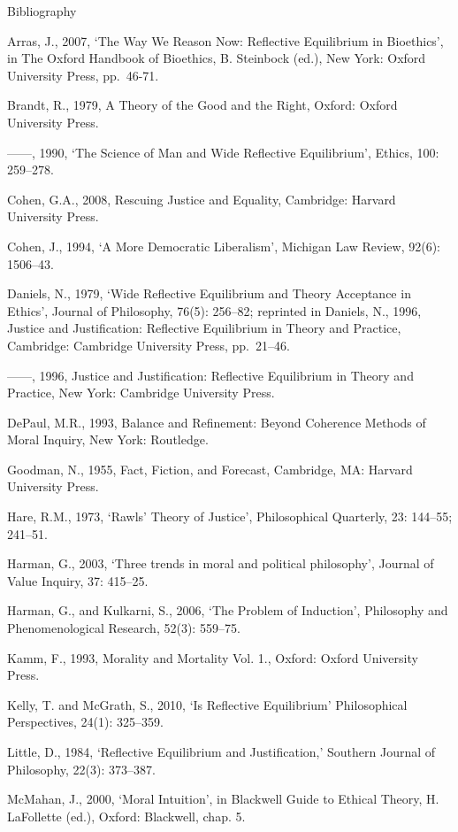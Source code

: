 \documentclass[]{article}
\begin{document}
\hypertarget{bibliography}{}
\protect\hypertarget{Bib}{}{Bibliography}

Arras, J., 2007, `The Way We Reason Now: Reflective Equilibrium in
Bioethics', in The Oxford Handbook of Bioethics, B. Steinbock (ed.), New
York: Oxford University Press, pp.~46-71.

Brandt, R., 1979, A Theory of the Good and the Right, Oxford: Oxford
University Press.

------, 1990, `The Science of Man and Wide Reflective Equilibrium',
Ethics, 100: 259--278.

Cohen, G.A., 2008, Rescuing Justice and Equality, Cambridge: Harvard
University Press.

Cohen, J., 1994, `A More Democratic Liberalism', Michigan Law Review,
92(6): 1506--43.

Daniels, N., 1979, `Wide Reflective Equilibrium and Theory Acceptance in
Ethics', Journal of Philosophy, 76(5): 256--82; reprinted in Daniels,
N., 1996, Justice and Justification: Reflective Equilibrium in Theory
and Practice, Cambridge: Cambridge University Press, pp.~21--46.

------, 1996, Justice and Justification: Reflective Equilibrium in
Theory and Practice, New York: Cambridge University Press.

DePaul, M.R., 1993, Balance and Refinement: Beyond Coherence Methods of
Moral Inquiry, New York: Routledge.

Goodman, N., 1955, Fact, Fiction, and Forecast, Cambridge, MA: Harvard
University Press.

Hare, R.M., 1973, `Rawls' Theory of Justice', Philosophical Quarterly,
23: 144--55; 241--51.

Harman, G., 2003, `Three trends in moral and political philosophy',
Journal of Value Inquiry, 37: 415--25.

Harman, G., and Kulkarni, S., 2006, `The Problem of Induction',
Philosophy and Phenomenological Research, 52(3): 559--75.

Kamm, F., 1993, Morality and Mortality Vol. 1., Oxford: Oxford
University Press.

Kelly, T. and McGrath, S., 2010, `Is Reflective Equilibrium'
Philosophical Perspectives, 24(1): 325--359.

Little, D., 1984, `Reflective Equilibrium and Justification,' Southern
Journal of Philosophy, 22(3): 373--387.

McMahan, J., 2000, `Moral Intuition', in Blackwell Guide to Ethical
Theory, H. LaFollette (ed.), Oxford: Blackwell, chap. 5.
\end{document}
